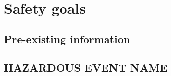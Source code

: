 \section{Safety goals}
%
%
% 

\subsection{Pre-existing information}
%

\subsection{HAZARDOUS EVENT NAME}
%
%
%
%
%
%
